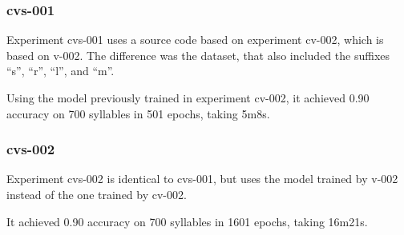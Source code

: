 \subsubsection{cvs-001}

Experiment cvs-001 uses a source code based on experiment cv-002, which is based on v-002. The difference was the dataset, that also included the suffixes ``s'', ``r'', ``l'', and ``m''.

Using the model previously trained in experiment cv-002, it achieved 0.90 accuracy on 700 syllables in 501 epochs, taking 5m8s.

\subsubsection{cvs-002}
Experiment cvs-002 is identical to cvs-001, but uses the model trained by v-002 instead of the one trained by cv-002.

It achieved 0.90 accuracy on 700 syllables in 1601 epochs, taking 16m21s.

